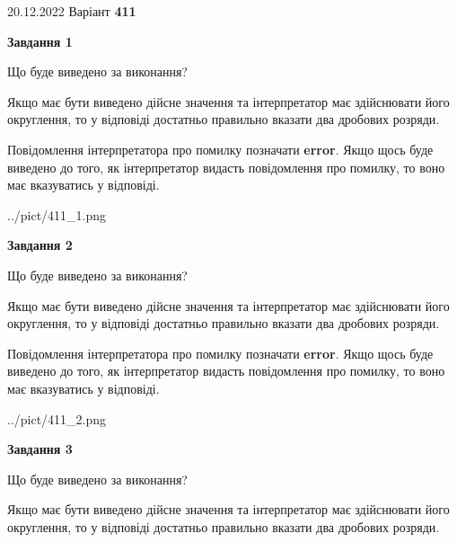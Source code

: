 \documentclass[12pt, ukrainian]{article}
\begin{document}
{20.12.2022 Варіант \No \textbf { 411 }\par}
{
\begin {Large}

{\begin {center}\textbf{Завдання 1}\end {center}}\par
Що буде виведено за виконання? \par

Якщо має бути виведено дійсне значення та інтерпретатор має здійснювати його округлення, 
то у відповіді достатньо правильно вказати два дробових розряди.

Повідомлення інтерпретатора про помилку позначати \textbf{error}.
Якщо щось буде виведено до того, як інтерпретатор видасть повідомлення про помилку, 
то воно має вказуватись у відповіді. \par

\begin{center}
	{../pict/411_1.png}
\end{center}
\newpage

{\begin {center}\textbf{Завдання 2}\end {center}}\par
Що буде виведено за виконання? \par

Якщо має бути виведено дійсне значення та інтерпретатор має здійснювати його округлення, 
то у відповіді достатньо правильно вказати два дробових розряди.

Повідомлення інтерпретатора про помилку позначати \textbf{error}.
Якщо щось буде виведено до того, як інтерпретатор видасть повідомлення про помилку, 
то воно має вказуватись у відповіді. \par

\begin{center}
	{../pict/411_2.png}
\end{center}
\newpage

{\begin {center}\textbf{Завдання 3}\end {center}}\par
Що буде виведено за виконання? \par

Якщо має бути виведено дійсне значення та інтерпретатор має здійснювати його округлення, 
то у відповіді достатньо правильно вказати два дробових розряди.


\end{Large}}
\end{document}
